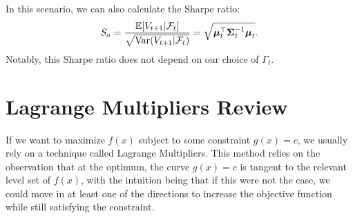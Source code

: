 In this scenario, we can also calculate the Sharpe ratio: $$ S_a = \frac{\mathbb E[V_{t+1}|\mathcal F_t]}{\sqrt{\operatorname{Var}(V_{t+1}|\mathcal F_t)}} = \sqrt{\boldsymbol{\mu}_t^\top\boldsymbol{\Sigma}_t^{-1}\boldsymbol{\mu}_t}. $$ Notably, this Sharpe ratio does not depend on our choice of $\Gamma_t$.

\section{Lagrange Multipliers Review}
If we want to maximize $f(x)$ subject to some constraint $g(x)=c$, we usually rely on a technique called Lagrange Multipliers. This method relies on the observation that at the optimum, the curve $g(x)=c$ is tangent to the relevant level set of $f(x)$, with the intuition being that if this were not the case, we could move in at least one of the directions to increase the objective function while still satisfying the constraint.

